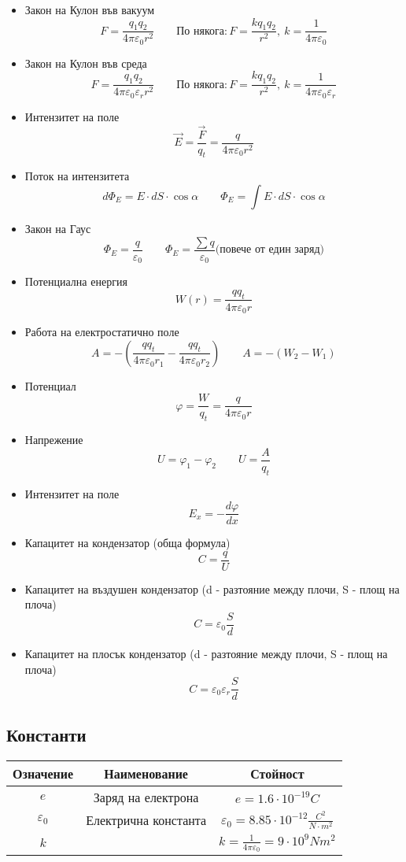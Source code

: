 \documentclass[fleqn, 12pt]{article}
\theoremstyle{definition}
\begin{document}
\begin{itemize}
\item Закон на Кулон във вакуум
$$F = \frac{q_1q_2}{4\pi \varepsilon_0 r^2} \qquad
\text{По някога:}\, F = \frac{kq_1q_2}{r^2}, \ k = \frac{1}{4\pi \varepsilon_0}$$
\item Закон на Кулон във среда
$$F = \frac{q_1q_2}{4\pi \varepsilon_0 \varepsilon_r r^2} \qquad
\text{По някога:}\, F = \frac{kq_1q_2}{r^2}, \ k = \frac{1}{4\pi \varepsilon_0 \varepsilon_r}$$
\item Интензитет на поле 
$$\vec{E} = \frac{\vec{F}}{q_t} = \frac{q}{4\pi \varepsilon_0 r^2}$$
\item Поток на интензитета
$$d\Phi_E = E \cdot dS \cdot \cos \alpha \qquad \Phi_E = \int E \cdot dS \cdot \cos \alpha $$
\item Закон на Гаус
$$\Phi_E = \frac{q}{\varepsilon_0} \qquad \Phi_E = \frac{\sum q}{\varepsilon_0} \text{(повече от един заряд)}$$
\item Потенциална енергия
$$W(r) = \frac{qq_t}{4 \pi \varepsilon_0 r}$$
\item Работа на електростатично поле
$$ A = - \left(\frac{q q_t}{4 \pi \varepsilon_0 r_1} - \frac{q q_t}{4 \pi \varepsilon_0 r_2} \right)
\qquad 
A = -(W_2 - W_1)$$ 
\item Потенциал 
$$\varphi = \frac{W}{q_t} = \frac{q}{4 \pi \varepsilon_0 r}$$
\item Напрежение 
$$U = \varphi_1 - \varphi_2 \qquad U = \frac{A}{q_t}$$
\item Интензитет на поле
$$E_x = -\frac{d\varphi}{dx}$$
\item Капацитет на кондензатор (обща формула)
$$C = \frac{q}{U}$$
\item Капацитет на въздушен кондензатор (d -  разтояние между плочи, S - площ на плоча) 
$$C = \varepsilon_0 \frac{S}{d}$$
\item Капацитет на плосък кондензатор (d -  разтояние между плочи, S - площ на плоча) 
$$C = \varepsilon_0 \varepsilon_r \frac{S}{d}$$
\end{itemize}
\newpage
\subsection{Константи}

\begin{center}
\begin{tabular}{ |c|c|c|}
\hline
\textbf{Означение} & \textbf{Наименование}&\textbf{Стойност}\\
\hline
$e$ & Заряд на електрона & $e =  1.6 \cdot 10^{-19} C$ \\
\hline
$\varepsilon_0$ & Електрична константа & $\varepsilon_0 =  8.85 \cdot 10^{-12} \frac{C^2}{N \cdot m^2}$ \\
\hline
$k$ &  & $ k= \frac{1}{4\pi \varepsilon_0} = 9 \cdot 10^9 Nm^2$ \\
\hline
\end{tabular}
\end{center}
\end{document}
